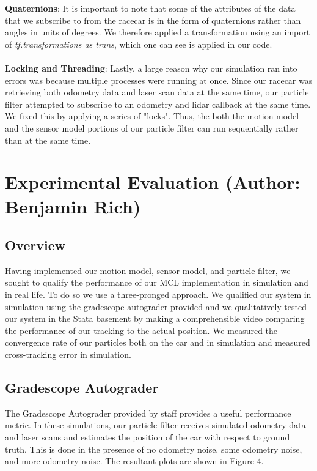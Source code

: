\documentclass{article}
\begin{document}
\textbf{Quaternions}: It is important to note that some of the attributes of the data that we subscribe to from the racecar is in the form of quaternions rather than angles in units of degrees. We therefore applied a transformation using an import of \emph{tf.transformations as trans}, which one can see is applied in our code.
\\
\\
\textbf{Locking and Threading}: Lastly, a large reason why our simulation ran into errors was because multiple processes were running at once. Since our racecar was retrieving both odometry data and laser scan data at the same time, our particle filter attempted to subscribe to an odometry and lidar callback at the same time. We fixed this by applying a series of "locks". Thus, the both the motion model and the sensor model portions of our particle filter can run sequentially rather than at the same time.

\section{Experimental Evaluation (Author: Benjamin Rich)}
\subsection{Overview}
 Having implemented our motion model, sensor model, and particle filter, we sought to qualify the performance of our MCL implementation in simulation and in real life. To do so we use a three-pronged approach. We qualified our system in simulation using the gradescope autograder provided and we qualitatively tested our system in the Stata basement by making a comprehensible video comparing the performance of our tracking to the actual position. We measured the convergence rate of our particles both on the car and in simulation and measured cross-tracking error in simulation. 

\subsection{Gradescope Autograder}
The Gradescope Autograder provided by staff provides a useful performance metric. In these simulations, our particle filter receives simulated odometry data and laser scans and estimates the position of the car with respect to ground truth. This is done in the presence of no odometry noise, some odometry noise, and more odometry noise. The resultant plots are shown in Figure 4. 
\end{document}
